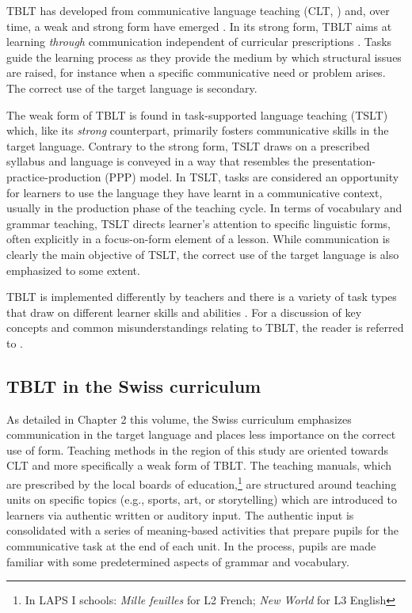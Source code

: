 \documentclass[output=paper]{langsci/langscibook}
\begin{document}
TBLT has developed from communicative language teaching (CLT, \citealt{Krashen1981}) and, over time, a weak and strong form have emerged \citep[109]{Ellis2017}. In its strong form, TBLT aims at learning \textit{through} communication independent of curricular prescriptions \citep{Ellis2017}. Tasks guide the learning process as they provide the medium by which structural issues are raised, for instance when a specific communicative need or problem arises. The correct use of the target language is secondary.

\begin{sloppypar}
The weak form of TBLT is found in task-supported language teaching (TSLT) which, like its \textit{strong} counterpart, primarily fosters communicative skills in the target language. Contrary to the strong form, TSLT draws on a prescribed syllabus and language is conveyed in a way that resembles the presentation-practice-production (PPP) model. In TSLT, tasks are considered an opportunity for learners to use the language they have learnt in a communicative context, usually in the production phase of the teaching cycle. In terms of vocabulary and grammar teaching, TSLT directs learner’s attention to specific linguistic forms, often explicitly in a focus-on-form element of a lesson. While communication is clearly the main objective of TSLT, the correct use of the target language is also emphasized to some extent. 
\end{sloppypar}

TBLT is implemented differently by teachers \citep{Ellis2009} and there is a variety of task types that draw on different learner skills and abilities \citep{Skehan1996}. For a discussion of key concepts and common misunderstandings relating to TBLT, the reader is referred to \citet{Ellis2009}.  

\subsection{TBLT in the Swiss curriculum}\label{sec:06:2.4}

As detailed in Chapter 2 this volume, the Swiss curriculum emphasizes communication in the target language and places less importance on the correct use of form. Teaching methods in the region of this study are oriented towards CLT and more specifically a weak form of TBLT. The teaching manuals, which are prescribed by the local boards of education,\footnote{In LAPS I schools: \textit{Mille feuilles} \citep{BertschyEtAl2012} for L2 French; \textit{New World} \citep{ArnetClarkEtAl2013} for L3 English} are structured around teaching units on specific topics (e.g., sports, art, or storytelling) which are introduced to learners via authentic written or auditory input. The authentic input is consolidated with a series of meaning-based activities that prepare pupils for the communicative task at the end of each unit. In the process, pupils are made familiar with some predetermined aspects of grammar and vocabulary. 
\end{document}
